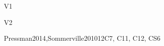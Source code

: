 \begin{syllabus}
\begin{competences}{V1}
    \item {} 
    \item {}
    \item {} 
    \item {} 
    \item {} 
    \item {} 
    \item {} 
    \item {} 
    \item {}  
\end{competences}

\begin{competences}{V2}
    \item {} 
    \item {}
    \item {} 
    \item {} 
    \item {} 
    \item {} 
    \item {} 
    \item {} 
    \item {}  
\end{competences}

\begin{unit}{\SESoftwareEvolution}{}{Pressman2014,Sommerville2010}{12}{C7, C11, C12, CS6}
\begin{topics}
    \item \SESoftwareEvolutionTopicSoftware
    \item \SESoftwareEvolutionTopicSoftwareEvolution
    \item \SESoftwareEvolutionTopicCharacteristics
    \item \SESoftwareEvolutionTopicReengineering
    \item \SESoftwareEvolutionTopicSoftwareReuse
\end{topics}
\begin{learningoutcomes}
    \item \SESoftwareEvolutionLOIdentifyTheAssociatedEvolution [\Familiarity] %
    \item \SESoftwareEvolutionLOEstimateTheA [\Usage] %
    \item \SESoftwareEvolutionLOUseRefactoring [\Usage] %
    \item \SESoftwareEvolutionLODiscussTheEvolving [\Familiarity] %
    \item \SESoftwareEvolutionLOOutlineTheRegression [\Familiarity] %
    \item \SESoftwareEvolutionLODiscussTheDisadvantagesTypes [\Familiarity] %
\end{learningoutcomes}
\end{unit}


\end{syllabus}
